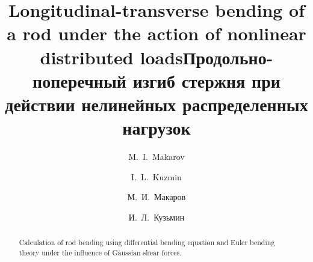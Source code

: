 \begin{englishtitle} %
\title{Longitudinal-transverse bending of a rod under the action of nonlinear distributed loads}
\author{M.~I.~Makarov  \and  I.~L.~Kuzmin}

\maketitle

\begin{abstract}
Calculation of rod bending using differential bending equation and Euler bending theory under the influence of Gaussian shear forces.

\end{abstract}
\end{englishtitle}

\iffalse
%
%

\documentclass[12pt]{llncs}  


\usepackage{iftex}

\ifPDFTeX
\usepackage[T2A]{fontenc}
\usepackage[utf8]{inputenc} %
\usepackage[english,russian]{babel}
\fi

\usepackage{todonotes} 

\usepackage[russian]{nla}


\fi

\title{Продольно-поперечный изгиб стержня при действии нелинейных распределенных нагрузок}
\author{М.~И.~Макаров    \and   И.~Л.~Кузьмин
}


